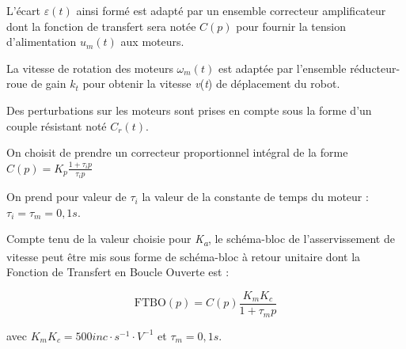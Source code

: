 L'écart $\varepsilon(t)$ ainsi formé est adapté par un ensemble correcteur
amplificateur dont la fonction de transfert sera notée $C(p)$ pour fournir la tension d'alimentation
\(u_{m}\left( t \right)\) aux moteurs.

La vitesse de rotation des moteurs \(\omega_{m}\left( t \right)\) est
adaptée par l'ensemble réducteur-roue de gain $k_t$ pour obtenir la vitesse \emph{v}(\emph{t}) de déplacement du robot.

Des perturbations sur les moteurs sont prises en compte sous la forme
d'un couple résistant noté $C_r(t)$.






On choisit de prendre un correcteur proportionnel intégral de la forme
\(C\left( p \right) = K_{p}\frac{1 + \tau_{i}p}{\tau_{i}p}\)


On prend pour valeur de \(\tau_{i}\) la valeur de la constante de temps
du moteur : \(\tau_{i} = \tau_{m}=0,1s\).


Compte tenu de la valeur choisie pour \emph{K\textsubscript{a}}, le
schéma-bloc de l'asservissement de vitesse peut être mis sous forme de
schéma-bloc à retour unitaire dont la Fonction de Transfert en Boucle
Ouverte est :

\[\text{FTBO}\left( p \right) = C(p) \frac{K_{m}K_{c}}{{1 + \tau}_{m}p}\]

avec $K_{m}K_{c} = 500 inc\cdot s^{-1}\cdot V^{-1}$ et $\tau_{m} = 0,1s$.



